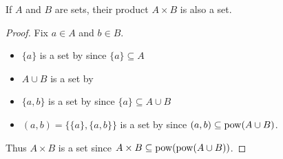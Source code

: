 \begin{proposition}\label{thm:binary_cartesian_product_is_set}
  If \( A \) and \( B \) are sets, their product \( A \times B \) is also a set.
\end{proposition}
\begin{proof}
  Fix \( a \in A \) and \( b \in B \).
  \begin{itemize}
    \item \( \{ a \} \) is a set by  since \( \{ a \} \subseteq A \)
    \item \( A \cup B \) is a set by 
    \item \( \{ a, b \} \) is a set by  since \( \{ a \} \subseteq A \cup B \)
    \item \( (a, b) = \{ \{ a \}, \{ a, b \} \} \) is a set by  since \( (a, b) \subseteq \operatorname{pow}(A \cup B) \).
  \end{itemize}

  Thus \( A \times B \) is a set since \( A \times B \subseteq \operatorname{pow}(\operatorname{pow}(A \cup B)) \).
\end{proof}
